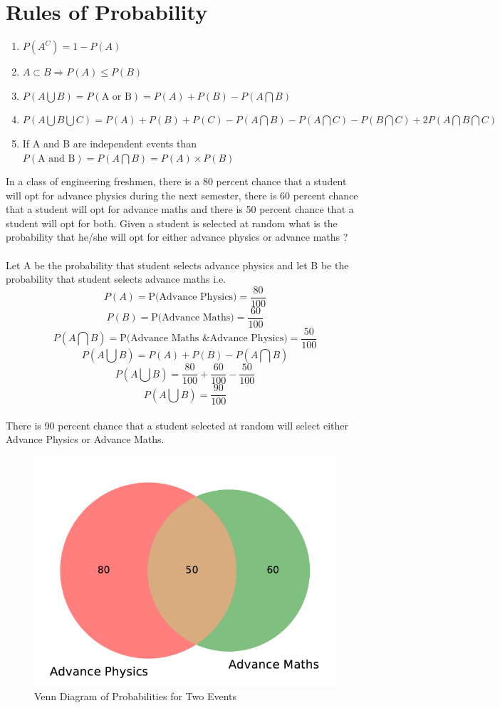 \documentclass[twoside,12pt]{report}  %
\begin{document}
\section{Rules of Probability}

\begin{enumerate}
	\item $ P(A^{C}) = 1 - P(A) $
	\item $ A \subset B \Longrightarrow P(A) \le P(B)$
	\item $ P(A \bigcup B) = P(\mbox{A or B}) = P(A) + P(B) - P(A \bigcap B) $
	\item $ P(A \bigcup B \bigcup C) = P(A) + P(B) + P(C) - P(A \bigcap B) - P(A \bigcap C) - P(B \bigcap C) + 2P(A \bigcap B \bigcap C) $
	\item If A and B are independent events than $P(\mbox{A and B}) = P(A \bigcap B) = P(A) \times P(B)$
\end{enumerate}

\begin{tcolorbox}[colback=blue!5!white, colframe=blue!75!black, title = \textbf{Union and Intersection of Two Sets}]
	In a class of engineering freshmen, there is a 80 percent chance that a student will opt for advance physics during the next semester, there is 60 percent chance that a student will opt for advance maths and there is 50 percent chance that a student will opt for both. Given a student is selected at random what is the probability that he/she will opt for either advance physics or advance maths ?
	\\
	\\
	Let A be the probability that student selects advance physics and let B be the probability that student selects advance maths i.e.
	$$ P(A) = \mbox{P(Advance Physics)} = \frac{80}{100} $$
	$$ P(B) = \mbox{P(Advance Maths)} = \frac{60}{100} $$
	$$ P(A \bigcap B) = \mbox{P(Advance Maths \& Advance Physics)} = \frac{50}{100} $$
	$$ P(A \bigcup B) =P(A) + P(B) - P(A \bigcap B) $$
	$$ P(A \bigcup B) = \frac{80}{100} + \frac{60}{100} - \frac{50}{100}  $$
	$$ P(A \bigcup B) = \frac{90}{100}  $$
	\\
	There is 90 percent chance that a student selected at random will select either Advance Physics or Advance Maths. 
	
	\begin{figure}[H]
		\centering
		\includegraphics[width=0.5\linewidth]{./images/figure_venn2.pdf}
		\caption{Venn Diagram of Probabilities for Two Events}
		\label{venn2}
	\end{figure}
\end{tcolorbox}
\end{document}
